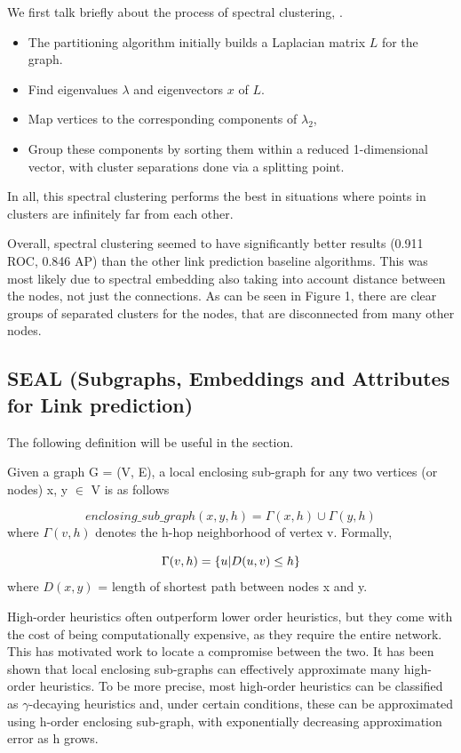 \documentclass[10pt,twocolumn,letterpaper]{article}
\begin{document}
We first talk briefly about the process of spectral clustering, \cite{Ng01onspectral}. 

\begin{itemize}
    \item The partitioning algorithm initially builds a Laplacian matrix $L$ for the graph.
    \item Find eigenvalues $\lambda$ and eigenvectors $x$ of $L$.
    \item Map vertices to the corresponding components of $\lambda_2$,
    \item Group these components by sorting them within a reduced 1-dimensional vector, with cluster separations done via a splitting point.
\end{itemize}  

In all, this spectral clustering performs the best in situations where points in clusters are infinitely far from each other. \cite{Ng01onspectral}

Overall, spectral clustering seemed to have significantly better results (0.911 ROC, 0.846 AP) than the other link prediction baseline algorithms. This was most likely due to spectral embedding also taking into account distance between the nodes, not just the connections. As can be seen in Figure 1, there are clear groups of separated clusters for the nodes, that are disconnected from many other nodes. 

\subsection{SEAL (Subgraphs, Embeddings and Attributes for Link prediction)}
The following definition will be useful in the section.

Given a graph G  = (V, E), a local enclosing sub-graph for any two vertices (or nodes) x, y $\in$ V is as follows

\[
enclosing\_sub\_graph(x, y, h) = \Gamma(x, h) \cup \Gamma(y, h)
\]
where $\Gamma(v, h)$ denotes the h-hop neighborhood of vertex v. Formally,

\[
\Gamma(v, h) = \{u\space|\space D(u, v) \leq h\}
\] where $D(x, y)$ = length of shortest path between nodes x and y.

High-order heuristics often outperform lower order heuristics, but they come with the cost of being computationally expensive, as they require the entire network. This has motivated work to locate a compromise between the two. It has been shown that local enclosing sub-graphs can effectively approximate many high-order heuristics. To be more precise, most high-order heuristics can be classified as $\gamma$-decaying heuristics and, under certain conditions, these can be approximated using h-order enclosing sub-graph, with exponentially decreasing approximation error as h grows.
\end{document}
